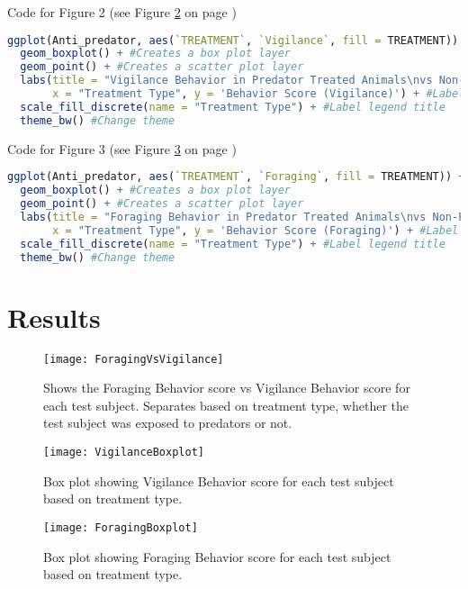 \documentclass[letterpaper]{article}
\begin{document}
Code for Figure 2 (see Figure \ref{fig:2} on page \pageref{fig:2})
\begin{lstlisting}[language = R]
ggplot(Anti_predator, aes(`TREATMENT`, `Vigilance`, fill = TREATMENT)) + #Using Anti_predator dataset, call for TREATMENT as my x-value and Vigilance for my y-values, also colors box plots based on treatment type
  geom_boxplot() + #Creates a box plot layer
  geom_point() + #Creates a scatter plot layer
  labs(title = "Vigilance Behavior in Predator Treated Animals\nvs Non-Predator Treated Animals",
       x = "Treatment Type", y = 'Behavior Score (Vigilance)') + #Label title, x-axis, and y-axis
  scale_fill_discrete(name = "Treatment Type") + #Label legend title
  theme_bw() #Change theme
\end{lstlisting}

Code for Figure 3 (see Figure \ref{fig:3} on page \pageref{fig:3})
\begin{lstlisting}[language = R]
ggplot(Anti_predator, aes(`TREATMENT`, `Foraging`, fill = TREATMENT)) + #Using Anti_predator dataset, call for TREATMENT as my x-value and Foraging for my y-values, also colors box plots based on treatment type
  geom_boxplot() + #Creates a box plot layer 
  geom_point() + #Creates a scatter plot layer
  labs(title = "Foraging Behavior in Predator Treated Animals\nvs Non-Predator Treated Animals",
       x = "Treatment Type", y = 'Behavior Score (Foraging)') + #Label title, x-axis, and y-axis
  scale_fill_discrete(name = "Treatment Type") + #Label legend title
  theme_bw() #Change theme
\end{lstlisting}

\section*{Results}
\begin{figure}[h]
	\caption{Shows the Foraging Behavior score vs Vigilance Behavior score for each test subject. Separates based on treatment type, whether the test subject was exposed to predators or not.\label{fig:1}}
	\centering
	\texttt{[image: ForagingVsVigilance]}
\end{figure}
\begin{figure}[h]
	\caption{Box plot showing Vigilance Behavior score for each test subject based on treatment type.\label{fig:2}}
	\centering
	\texttt{[image: VigilanceBoxplot]}
\end{figure}
\begin{figure}[h]
	\caption{Box plot showing Foraging Behavior score for each test subject based on treatment type.\label{fig:3}}
	\centering
	\texttt{[image: ForagingBoxplot]}
\end{figure}
\clearpage
\end{document}
